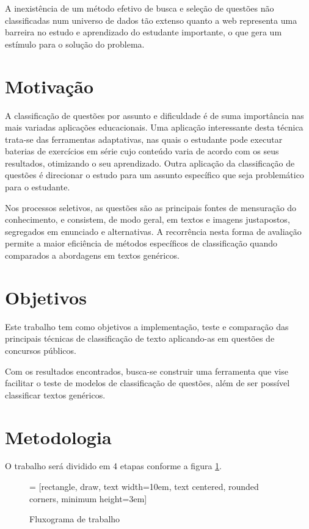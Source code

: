 A inexistência de um método efetivo de busca e seleção de questões não classificadas num universo de dados tão extenso quanto a web representa uma barreira no estudo e aprendizado do estudante importante, o que gera um estímulo para o solução do problema.

\section{Motivação}
A classificação de questões por assunto e dificuldade é de suma importância nas mais variadas aplicações educacionais. Uma aplicação interessante desta técnica trata-se das ferramentas adaptativas, nas quais o estudante pode executar baterias de exercícios em série cujo conteúdo varia de acordo com os seus resultados, otimizando o seu aprendizado. Outra aplicação da classificação de questões é direcionar o estudo para um assunto específico que seja problemático para o estudante.

Nos processos seletivos, as questões são as principais fontes de mensuração do conhecimento, e consistem, de modo geral, em textos e imagens justapostos, segregados em enunciado e alternativas. A recorrência nesta forma de avaliação permite a maior eficiência de métodos específicos de classificação quando comparados a abordagens em textos genéricos.

\section{Objetivos}
Este trabalho tem como objetivos a implementação, teste e comparação das principais técnicas de classificação de texto aplicando-as em questões de concursos públicos.

Com os resultados encontrados, busca-se construir uma ferramenta que vise facilitar o teste de modelos de classificação de questões, além de ser possível classificar textos genéricos.

\section{Metodologia}
\label{sec:metodology}
O trabalho será dividido em 4 etapas conforme a figura \ref{fig:fluxogram}.

\begin{figure}[!ht]
  \centering
   = [rectangle, draw, text width=10em, text centered, rounded      corners, minimum height=3em]
  \caption{Fluxograma de trabalho}
  \label{fig:fluxogram}
\end{figure}

